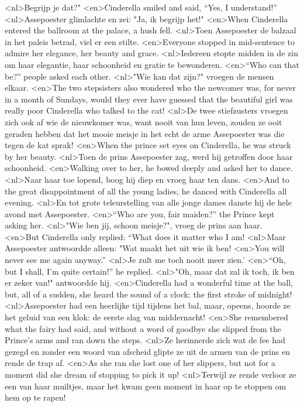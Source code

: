 <nl>Begrijp je dat?"
<en>Cinderella smiled and said, “Yes, I understand!”
<nl>Assepoester glimlachte en zei: "Ja, ik begrijp het!"
<en>When Cinderella entered the ballroom at the palace, a hush fell.
<nl>Toen Assepoester de balzaal in het paleis betrad, viel er een stilte.
<en>Everyone stopped in mid-sentence to admire her elegance, her beauty and grace.
<nl>Iedereen stopte midden in de zin om haar elegantie, haar schoonheid en gratie te bewonderen.
<en>“Who can that be?” people asked each other.
<nl>"Wie kan dat zijn?" vroegen de mensen elkaar.
<en>The two stepsisters also wondered who the newcomer was, for never in a month of Sundays, would they ever have guessed that the beautiful girl was really poor Cinderella who talked to the cat!
<nl>De twee stiefzusters vroegen zich ook af wie de nieuwkomer was, want nooit van hun leven, zouden ze ooit geraden hebben dat het mooie meisje in het echt de arme Assepoester was die tegen de kat sprak!
<en>When the prince set eyes on Cinderella, he was struck by her beauty.
<nl>Toen de prins Assepoester zag, werd hij getroffen door haar schoonheid.
<en>Walking over to her, he bowed deeply and asked her to dance.
<nl>Naar haar toe lopend, boog hij diep en vroeg haar ten dans.
<en>And to the great disappointment of all the young ladies, he danced with Cinderella all evening.
<nl>En tot grote teleurstelling van alle jonge dames danste hij de hele avond met Assepoester.
<en>“Who are you, fair maiden?” the Prince kept asking her.
<nl>"Wie ben jij, schoon meisje?", vroeg de prins aan haar.
<en>But Cinderella only replied: “What does it matter who I am!
<nl>Maar Assepoester antwoordde alleen: "Wat maakt het uit wie ik ben!
<en>You will never see me again anyway.”
<nl>Je zult me toch nooit meer zien.'
<en>“Oh, but I shall, I’m quite certain!” he replied.
<nl>"Oh, maar dat  zal ik toch, ik ben er zeker van!" antwoordde hij.
<en>Cinderella had a wonderful time at the ball, but, all of a sudden, she heard the sound of a clock: the first stroke of midnight!
<nl>Assepoester had een heerlijke tijd tijdens het bal, maar, opeens, hoorde ze het geluid van een klok: de eerste slag van middernacht!
<en>She remembered what the fairy had said, and without a word of goodbye she slipped from the Prince’s arms and ran down the steps.
<nl>Ze herinnerde zich wat de fee had gezegd en zonder een woord van afscheid glipte ze uit de armen van de prins en rende de trap af.
<en>As she ran she lost one of her slippers, but not for a moment did she dream of stopping to pick it up!
<nl>Terwijl ze rende verloor ze een van haar muiltjes, maar het kwam geen moment in haar op te stoppen om hem op te rapen!
